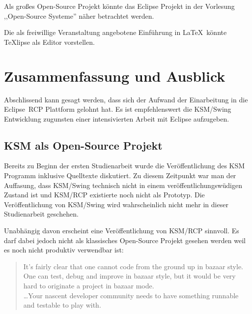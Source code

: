 \documentclass[%
12pt,titlepage,abstracton,DIV=10]{scrreprt}
\begin{document}
Als großes Open-Source Projekt könnte das Eclipse Projekt in der Vorlesung
,,Open-Source Systeme'' näher betrachtet werden.

Die als freiwillige Veranstaltung angebotene Einführung in \LaTeX\ könnte
TeXlipse als Editor vorstellen.



\chapter{Zusammenfassung und Ausblick}\label{chapter:ausblick}
Abschlissend kann gesagt werden, dass sich der Aufwand der Einarbeitung in die
Eclipse~RCP Plattform gelohnt hat. Es ist empfehlenswert die KSM/Swing
Entwicklung zugunsten einer intensivierten Arbeit mit Eclipse aufzugeben.

\section{KSM als Open-Source Projekt}
Bereits zu Beginn der ersten Studienarbeit wurde die Veröffentlichung des KSM
Programm inklusive Quelltexte diskutiert. Zu diesem Zeitpunkt war man der
Auffasung, dass KSM/Swing technisch nicht in einem veröffentlichungswüdigen
Zustand ist und KSM/RCP existierte noch nicht als Prototyp.
Die Veröffentlichung von KSM/Swing wird wahrscheinlich nicht mehr in dieser
Studienarbeit geschehen.

Unabhängig davon erscheint eine Veröffentlichung von KSM/RCP sinnvoll. Es darf
dabei jedoch nicht als klassisches Open-Source Projekt gesehen werden weil es
noch nicht produktiv verwendbar ist:
\begin{quote}
It's fairly clear that one cannot code from the ground up in bazaar style.
One can test, debug and improve in bazaar style, but it would be very hard to
originate a project in bazaar mode.\\
\ldots Your nascent developer community needs to have something runnable and
testable to play with.
\end{quote}
\end{document}
